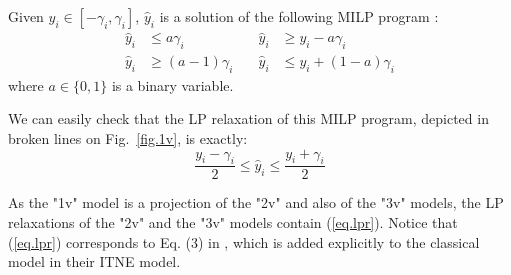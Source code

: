 \newpage

    \begin{proposition}
    \label{prop3}
    Given $y_i \in [-\gamma_i,\gamma_i]$, 
    $\hat{y}_i$ is a solution of the following MILP program :\begin{align*}
		\hat{y}_i &\leq a \gamma_i               &\quad \hat{y}_i &\geq y_i - a \gamma_i \\
		\hat{y}_i &\geq (a-1) \gamma_i           &\quad \hat{y}_i &\leq y_i + (1-a) \gamma_i
	\end{align*} where $a \in \{0,1\}$ is a binary variable.
	\end{proposition}

    We can easily check that the LP relaxation of this MILP program,
	depicted in broken lines on Fig.~\ref{fig.1v}, is exactly: 
    \begin{equation}
		\label{eq.lpr}
	  \frac{y_i-\gamma_i}{2} \leq \hat{y}_i \leq \frac{y_i+\gamma_i}{2}
	\end{equation}

	As the "1v" model is a projection of the "2v" and also of the "3v" models, 
	the LP relaxations of the "2v" and the "3v" models contain (\ref{eq.lpr}).
	Notice that (\ref{eq.lpr}) corresponds to Eq. (3) in \cite{ITNE}, 
	which is added explicitly to the classical model in their ITNE model.
	
    
	
	

	\iffalse
	Based on above constraints, we can sketch this simplified model:
	\begin{enumerate}
		\item For each input node, each output node, and each pre-activation and post-activation node in the hidden layers,  set one variable $y_i$. 
		\item Set constraints for input nodes.
		\item Set linear constraints . In this case, since the meaning of $y_i$ is $x_i-x'_i$, this constraints will not use the bias.
		\item Between pre- and post- activation nodes, set the MILP constraint described above.
	\end{enumerate}
	
	The key point is that, although this model sets 3 variables (and their binary variables) for each node in the network, only $y_i$  contributes to the final results, and we can ignore $x_i,x_i'$ (and their binary variables) during the optimization.
	
	As a result, we can relax the binary variables used to $\hat{x}_i = \ReLU(x_i)$ and $\hat{x}'_i = \ReLU(x'_i)$.
	\fi

    


    